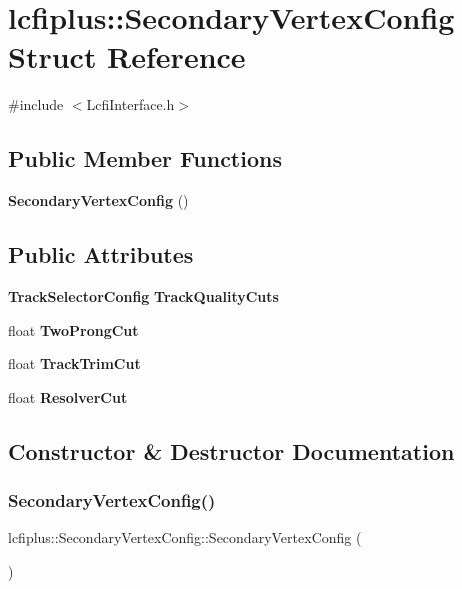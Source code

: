 \section{lcfiplus\+:\+:Secondary\+Vertex\+Config Struct Reference}
\label{structlcfiplus_1_1SecondaryVertexConfig}


{\ttfamily \#include $<$Lcfi\+Interface.\+h$>$}

\subsection*{Public Member Functions}
\begin{DoxyCompactItemize}
\item 
\textbf{ Secondary\+Vertex\+Config} ()
\end{DoxyCompactItemize}
\subsection*{Public Attributes}
\begin{DoxyCompactItemize}
\item 
\textbf{ Track\+Selector\+Config} \textbf{ Track\+Quality\+Cuts}
\item 
float \textbf{ Two\+Prong\+Cut}
\item 
float \textbf{ Track\+Trim\+Cut}
\item 
float \textbf{ Resolver\+Cut}
\end{DoxyCompactItemize}


\subsection{Constructor \& Destructor Documentation}
\mbox{\label{structlcfiplus_1_1SecondaryVertexConfig_aa92a1d7ea52279a39694ea211d0b5d4b}} 
\subsubsection{Secondary\+Vertex\+Config()}
{\footnotesize\ttfamily lcfiplus\+::\+Secondary\+Vertex\+Config\+::\+Secondary\+Vertex\+Config (\begin{DoxyParamCaption}{ }\end{DoxyParamCaption})\hspace{0.3cm}{\ttfamily [inline]}}



